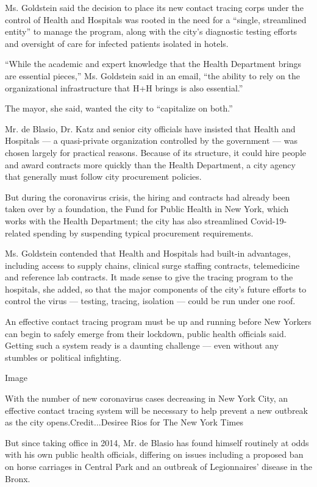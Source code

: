 Ms. Goldstein said the decision to place its new contact tracing corps
under the control of Health and Hospitals was rooted in the need for a
``single, streamlined entity'' to manage the program, along with the
city's diagnostic testing efforts and oversight of care for infected
patients isolated in hotels.

``While the academic and expert knowledge that the Health Department
brings are essential pieces,'' Ms. Goldstein said in an email, ``the
ability to rely on the organizational infrastructure that H+H brings is
also essential.''

The mayor, she said, wanted the city to ``capitalize on both.''

Mr. de Blasio, Dr. Katz and senior city officials have insisted that
Health and Hospitals --- a quasi-private organization controlled by the
government --- was chosen largely for practical reasons. Because of its
structure, it could hire people and award contracts more quickly than
the Health Department, a city agency that generally must follow city
procurement policies.

But during the coronavirus crisis, the hiring and contracts had already
been taken over by a foundation, the Fund for Public Health in New York,
which works with the Health Department; the city has also streamlined
Covid-19-related spending by suspending typical procurement
requirements.

Ms. Goldstein contended that Health and Hospitals had built-in
advantages, including access to supply chains, clinical surge staffing
contracts, telemedicine and reference lab contracts. It made sense to
give the tracing program to the hospitals, she added, so that the major
components of the city's future efforts to control the virus ---
testing, tracing, isolation --- could be run under one roof.

An effective contact tracing program must be up and running before New
Yorkers can begin to safely emerge from their lockdown, public health
officials said. Getting such a system ready is a daunting challenge ---
even without any stumbles or political infighting.

Image

With the number of new coronavirus cases decreasing in New York City, an
effective contact tracing system will be necessary to help prevent a new
outbreak as the city opens.Credit...Desiree Rios for The New York Times

But since taking office in 2014, Mr. de Blasio has found himself
routinely at odds with his own public health officials, differing on
issues including a proposed ban on horse carriages in Central Park and
an outbreak of Legionnaires' disease in the Bronx.


